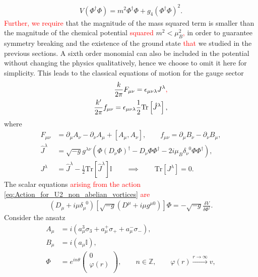 \begin{align}
V\left(\Phi^{\dag} \Phi \right)= m^2 \Phi^{\dag} \Phi + g_4\left( \Phi^{\dag} \Phi\right)^2.
\end{align}
 \textcolor{red}{Further, we require} that the magnitude of the mass squared term is smaller than the magnitude of the chemical potential \textcolor{red}{squared} $m^2<\mu_B^2$\textcolor{red}{,} in order to guarantee symmetry breaking and the existence of the ground state \textcolor{red}{that} we studied in the previous sections. A sixth order monomial can also be included in the potential without changing the physics qualitatively, hence we choose to omit it here for simplicity. This leads to the classical equations of motion for the gauge sector
\begin{align}
    \frac{k}{2 \pi} F_{\mu \nu} = \epsilon_{\mu \nu \lambda} J^{\lambda}\textcolor{red}{,}\\
    \frac{k'}{2\pi} f_{\mu \nu} = \epsilon_{\mu \nu \lambda} \frac{1}{2} \mathrm{Tr} \left[\hat{J}^{\lambda} \right],
\end{align}
where
\begin{align}
    F_{\mu \nu}&= \partial_{\mu} A_{\nu} - \partial_{\nu}A_{\mu} + [A_{\mu}, A_{\nu}], \qquad f_{\mu \nu} = \partial_{\mu} B_{\nu} - \partial_{\nu} B_{\mu}, \\
    \hat{J}^{\lambda} &= \sqrt{-g} g^{\lambda \nu} \left( \Phi \left( D_{\nu} \Phi\right)^{\dag} - D_{\nu} \Phi \Phi^{\dag}   -2i \mu_B \delta^{\;\; 0}_{\nu} \Phi \Phi^{\dag}  \right), \\
    J^{\lambda} &= \hat{J}^{\lambda} - \frac{1}{2}\mathrm{Tr}\left[\hat{J}^{\lambda} \right]\mathbb{I} \qquad \implies \qquad \mathrm{Tr}\left[J^{\lambda}\right]=0.
\end{align}
The scalar equations \textcolor{red}{arising from the action \eqref{eq:Action_for_U2_non_abelian_vortices} are} 
\begin{align}
    \left(D_{\mu} + i\mu \delta_{\mu}^{\;\; 0} \right) \left[\sqrt{-g} \left(D^{\mu}+i \mu g^{\mu 0}\right)\right] \Phi = - \sqrt{-g} \frac{\delta V}{\delta \Phi^{\dag}}. \label{eq:U2_scalar_EOM}
\end{align}
Consider the ansatz
\begin{align}
    A_{\mu} &= i \left(a_{\mu}^3 \sigma_3 + a_{\mu}^+ \sigma_{+} +a_{\mu}^{-} \sigma_{-} \right), \label{eq:U2_ansatz_non_abelian_gauge} \\
    B_{\mu} &= i \left( a_{\mu} \mathbb{I} \right), \label{eq:U2_ansatz_abelian_gauge}\\
    \Phi &=  e^{i n \theta} \begin{pmatrix}
        0\\
        \varphi(r)\\
    \end{pmatrix}, \qquad n\in \mathbb{Z}, \qquad \varphi(r) \xrightarrow{r \rightarrow \infty} v, \label{eq:U2_ansatz_scalar}
\end{align}
